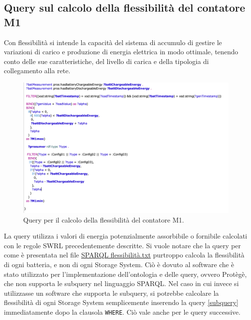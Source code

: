 \subsection{Query sul calcolo della flessibilità del contatore M1}

Con flessibilità si intende la capacità del sistema di accumulo di gestire le variazioni di carico e produzione di energia elettrica in modo ottimale, tenendo conto delle sue caratteristiche, del livello di carica e della tipologia di collegamento alla rete.

\begin{figure}[H]
    \centering
    \includegraphics[width=15cm]{images/query_flessibilita.png}
    \caption{Query per il calcolo della flessibilità del contatore M1.}
    \label{fig:query_flessibilita}
\end{figure}

La query utilizza i valori di energia potenzialmente assorbibile o fornibile calcolati con le regole SWRL precedentemente descritte.
Si vuole notare che la query per come è presentata nel file \href{https://github.com/19eddie/SemanticWeb-Assignment02-03/blob/main/SPARQL%20flessibilit%C3%A0.txt}{SPARQL flessibilità.txt} 
purtroppo calcola la flessibilità di ogni batteria, e non di ogni Storage System.
Ciò è dovuto al software che è stato utilizzato per l'implementazione dell'ontologia e delle query, ovvero Protègè,
che non supporta le subquery nel linguaggio SPARQL.
Nel caso in cui invece si utilizzasse un software che supporta le subquery, si potrebbe calcolare la flessibilità di ogni Storage System semplicemente inserendo la query \ref*{subquery} immediatamente dopo la clausola \texttt{WHERE}.
Ciò vale anche per le query successive.

